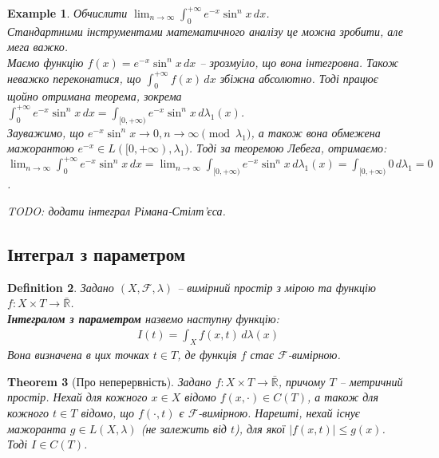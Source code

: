 \documentclass[a4paper, 10pt]{article}
\theoremstyle{theoremdd}
\newtheorem{theorem}{Theorem}[subsection]
\newtheorem{definition}[theorem]{Definition}
\newtheorem{example}[theorem]{Example}
\begin{document}
\begin{example}
Обчислити $\displaystyle\lim_{n \to \infty} \int_0^{+\infty} e^{-x} \sin^n x\,dx$.\\
Стандартними інструментами математичного аналізу це можна зробити, але мега важко.\\
Маємо функцію $f(x) = e^{-x} \sin^n x\,dx$ -- зрозмуіло, що вона інтегровна. Також неважко переконатися, що $\displaystyle\int_0^{+\infty} f(x)\,dx$ збіжна абсолютно. Тоді працює щойно отримана теорема, зокрема\\
$\displaystyle\int_0^{+\infty} e^{-x} \sin^n x\,dx = \int_{[0,+\infty)} e^{-x} \sin^n x \,d\lambda_1(x)$.\\
Зауважимо, що $e^{-x} \sin^n x \to 0, n \to \infty \pmod {\lambda_1}$, а також вона обмежена мажорантою $e^{-x} \in L([0,+\infty),\lambda_1)$. Тоді за теоремою Лебега, отримаємо:\\
$\displaystyle\lim_{n \to \infty} \int_0^{+\infty} e^{-x} \sin^n x\,dx = \lim_{n \to \infty}\int_{[0,+\infty)} e^{-x} \sin^n x \,d\lambda_1(x) = \int_{[0,+\infty)} 0\,d\lambda_1 = 0$.
\end{example}

\textit{TODO: додати інтеграл Рімана-Стілт'єса.}

\subsection{Інтеграл з параметром}
\begin{definition}
Задано $(X,\mathcal{F},\lambda)$ -- вимірний простір з мірою та функцію $f \colon X \times T \to \bar{\mathbb{R}}$.\\
\textbf{Інтегралом з параметром} назвемо наступну функцію:
\begin{align*}
I(t) = \int_X f(x,t)\,d\lambda(x)
\end{align*}
Вона визначена в цих точках $t \in T$, де функція $f$ стає $\mathcal{F}$-вимірною.
\end{definition}

\begin{theorem}[Про неперервність]
Задано $f \colon X \times T \to \bar{\mathbb{R}}$, причому $T$ -- метричний простір. Нехай для кожного $x \in X$ відомо $f(x,\cdot) \in C(T)$, а також для кожного $t \in T$ відомо, що $f(\cdot,t)$ є $\mathcal{F}$-вимірною. Нарешті, нехай існує мажоранта $g \in L(X,\lambda)$ (не залежить від $t$), для якої $|f(x,t)| \leq g(x)$.\\
Тоді $I \in C(T)$.
\end{theorem}
\end{document}
